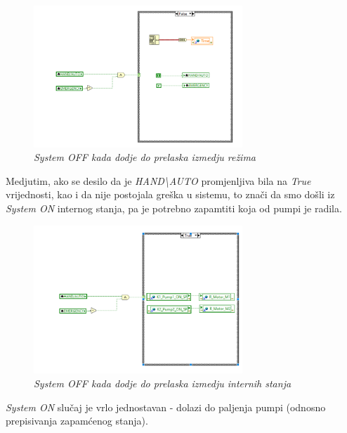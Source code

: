 \documentclass[12pt, titlepage]{article}
\begin{document}
                \begin{figure}[ht]
                    \centering
                    \includegraphics[width=0.7\textwidth]{Slike/HAND_AUTO.vi AUTO SYSTEM OFF 1.png}
                    \caption{\textit{System OFF kada dodje do prelaska izmedju režima}}
                \end{figure}

                Medjutim, ako se desilo da je \textit{HAND\textbackslash{}AUTO} promjenljiva bila na 
                \textit{True} vrijednosti, kao i da nije postojala greška u sistemu, 
                to znači da smo došli iz \textit{System ON} internog stanja, pa je potrebno
                zapamtiti koja od pumpi je radila. 

                \newpage

                \begin{figure}[ht]
                    \centering
                    \includegraphics[width=0.7\textwidth]{Slike/HAND_AUTO.vi AUTO SYSTEM OFF 2.png}
                    \caption{\textit{System OFF kada dodje do prelaska izmedju internih stanja}}
                \end{figure}

                \textit{System ON} slučaj je vrlo jednostavan - dolazi do paljenja pumpi (odnosno prepisivanja
                zapamćenog stanja).
\end{document}
